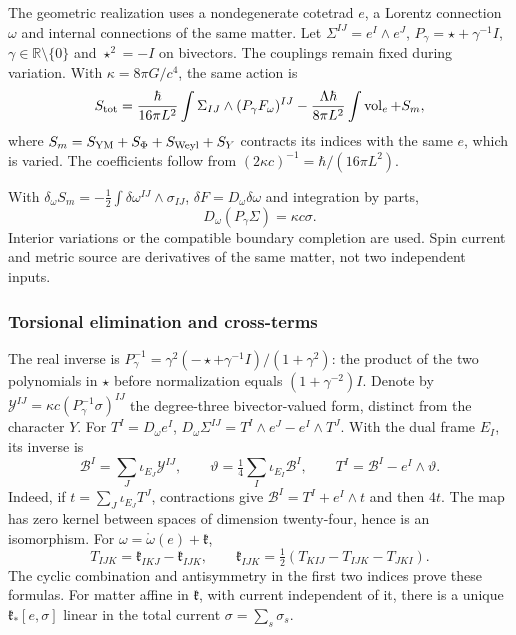 The geometric realization uses a nondegenerate cotetrad $e$, a Lorentz connection $\omega$ and internal connections of the same matter. Let $\Sigma^{IJ}=e^I\wedge e^J$, $P_\gamma=\star+\gamma^{-1}I$, $\gamma\in\mathbb R\setminus\{0\}$ and $\star^2=-I$ on bivectors. The couplings remain fixed during variation. With $\kappa=8\pi G/c^4$, the same action is
\begin{equation}
S_{\rm tot}=\frac{\hbar}{16\pi L^2}
\int\Sigma_{IJ}\wedge(P_\gamma F_\omega)^{IJ}
-\frac{\Lambda\hbar}{8\pi L^2}\int\operatorname{vol}_e+S_m,
\label{hmtcuatro:gea:accion-total}
\end{equation}
where $S_m=S_{\rm YM}+S_\Phi+S_{\rm Weyl}+S_Y$ contracts its indices with the same $e$, which is varied. The coefficients follow from $(2\kappa c)^{-1}=\hbar/(16\pi L^2)$.

With $\delta_\omega S_m=-\tfrac12\int
\delta\omega^{IJ}\wedge\sigma_{IJ}$, $\delta F=D_\omega\delta\omega$ and integration by parts,
\begin{equation}
D_\omega(P_\gamma\Sigma)=\kappa c\sigma.
\label{hmtcuatro:gea:cartan}
\end{equation}
Interior variations or the compatible boundary completion are used. Spin current and metric source are derivatives of the same matter, not two independent inputs.

\subsubsection{Torsional elimination and cross-terms}
\label{hmtcuatro:gea:torsion}

The real inverse is $P_\gamma^{-1}=\gamma^2(-\star+\gamma^{-1}I)/(1+\gamma^2)$: the product of the two polynomials in $\star$ before normalization equals $(1+\gamma^{-2})I$. Denote by $\mathcal Y^{IJ}=\kappa c(P_\gamma^{-1}\sigma)^{IJ}$ the degree-three bivector-valued form, distinct from the character $Y$. For $T^I=D_\omega e^I$, $D_\omega\Sigma^{IJ}=T^I\wedge e^J-e^I\wedge T^J$. With the dual frame $E_I$, its inverse is
\[
\mathcal B^I=\sum_J\iota_{E_J}\mathcal Y^{IJ},\qquad
\vartheta=\tfrac14\sum_I\iota_{E_I}\mathcal B^I,\qquad
T^I=\mathcal B^I-e^I\wedge\vartheta.
\]
Indeed, if $t=\sum_J\iota_{E_J}T^J$, contractions give $\mathcal B^I=T^I+e^I\wedge t$ and then $4t$. The map has zero kernel between spaces of dimension twenty-four, hence is an isomorphism. For $\omega=\mathring\omega(e)+\mathfrak k$,
\[
T_{IJK}=\mathfrak k_{IKJ}-\mathfrak k_{IJK},\qquad
\mathfrak k_{IJK}=\tfrac12(T_{KIJ}-T_{IJK}-T_{JKI}).
\]
The cyclic combination and antisymmetry in the first two indices prove these formulas. For matter affine in $\mathfrak k$, with current independent of it, there is a unique $\mathfrak k_*[e,\sigma]$ linear in the total current $\sigma=\sum_s\sigma_s$.

